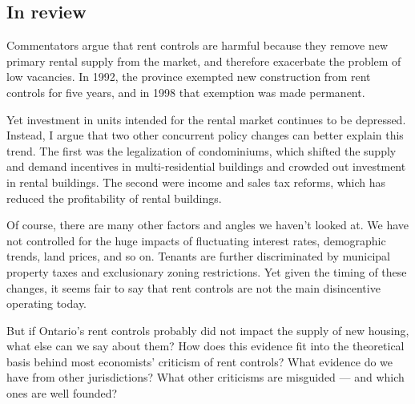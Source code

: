 \subsection{In review}

Commentators argue that rent controls are harmful because they remove new primary rental supply from the market, and therefore exacerbate the problem of low vacancies. In 1992, the province exempted new construction from rent controls for five years, and in 1998 that exemption was made permanent.

Yet investment in units intended for the rental market continues to be depressed. Instead, I argue that two other concurrent policy changes can better explain this trend. The first was the legalization of condominiums, which shifted the supply and demand incentives in multi-residential buildings and crowded out investment in rental buildings. The second were income and sales tax reforms, which has reduced the profitability of rental buildings.

Of course, there are many other factors and angles we haven't looked at. We have not controlled for the huge impacts of fluctuating interest rates, demographic trends, land prices, and so on. Tenants are further discriminated by municipal property taxes and exclusionary zoning restrictions. Yet given the timing of these changes, it seems fair to say that rent controls are not the main disincentive operating today.

But if Ontario's rent controls probably did not impact the supply of new housing, what else can we say about them? How does this evidence fit into the theoretical basis behind most economists' criticism of rent controls? What evidence do we have from other jurisdictions? What other criticisms are misguided — and which ones are well founded?
